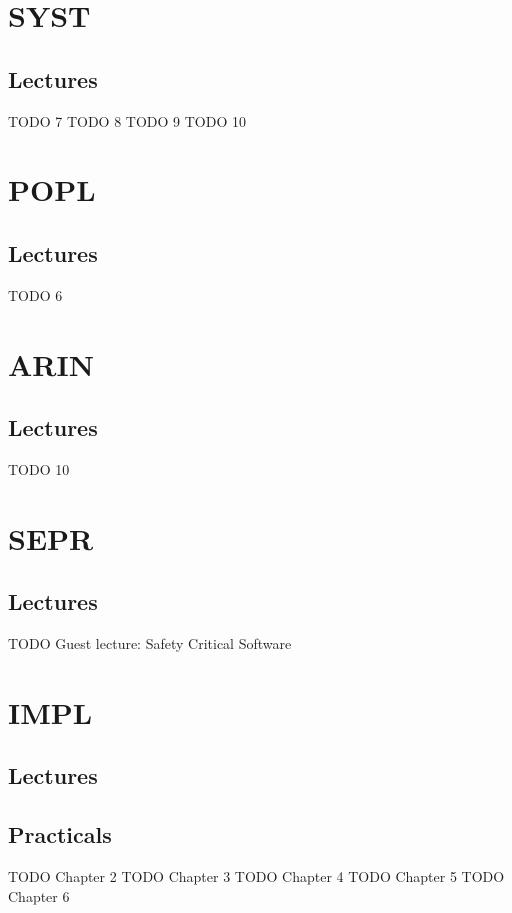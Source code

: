 \documentclass[11pt]{article}
\date{\today}
\title{}
\begin{document}
\tableofcontents

\section{SYST}
\label{sec:org6ac618c}
\subsection{Lectures}
\label{sec:org3807c11}
TODO 7
TODO 8
TODO 9
TODO 10
\section{POPL}
\label{sec:orgdf5afb4}
\subsection{Lectures}
\label{sec:org524b07a}
TODO 6
\section{ARIN}
\label{sec:orgd32fd7f}
\subsection{Lectures}
\label{sec:org59b65a4}
TODO 10
\section{SEPR}
\label{sec:orgc80bc27}
\subsection{Lectures}
\label{sec:orgc428992}
TODO Guest lecture: Safety Critical Software

\section{IMPL}
\label{sec:org76d6ae9}
\subsection{Lectures}
\label{sec:org3c0c73d}
\subsection{Practicals}
\label{sec:org4c8b933}
TODO Chapter 2
TODO Chapter 3
TODO Chapter 4
TODO Chapter 5
TODO Chapter 6
\end{document}
